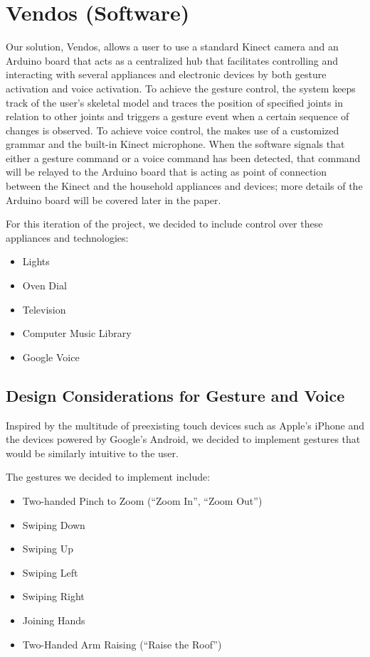 \documentclass{chi-ext}
\begin{document}
\section{Vendos (Software)}

Our solution, Vendos, allows a user to use a standard Kinect camera and an Arduino board that acts as a centralized hub that facilitates controlling and interacting with several appliances and electronic devices by both gesture activation and voice activation.
To achieve the gesture control, the system keeps track of the user's skeletal model and traces the position of specified joints in relation to other joints and triggers a gesture event when a certain sequence of changes is observed.
To achieve voice control, the makes use of a customized grammar and the built-in Kinect microphone.
When the software signals that either a gesture command or a voice command has been detected, that command will be relayed to the Arduino board that is acting as point of connection between the Kinect and the household appliances and devices;
more details of the Arduino board will be covered later in the paper.
 
For this iteration of the project, we decided to include control over these appliances and technologies:
\begin{itemize}\compresslist
\item 	
Lights
\item
Oven Dial
\item
Television
\item
Computer Music Library
\item
Google Voice
\end{itemize}
 
\subsection{Design Considerations for Gesture and Voice}
 
Inspired by the multitude of preexisting touch devices such as Apple's iPhone and the devices powered by Google's Android, we decided to implement gestures that would be similarly intuitive to the user.
 
The gestures we decided to implement include:
\begin{itemize}\compresslist
\item
Two-handed Pinch to Zoom (``Zoom In'', ``Zoom Out'')
\item
Swiping Down
\item
Swiping Up
\item
Swiping Left
\item
Swiping Right
\item
Joining Hands
\item
Two-Handed Arm Raising (``Raise the Roof'')
\end{itemize}
\end{document}
